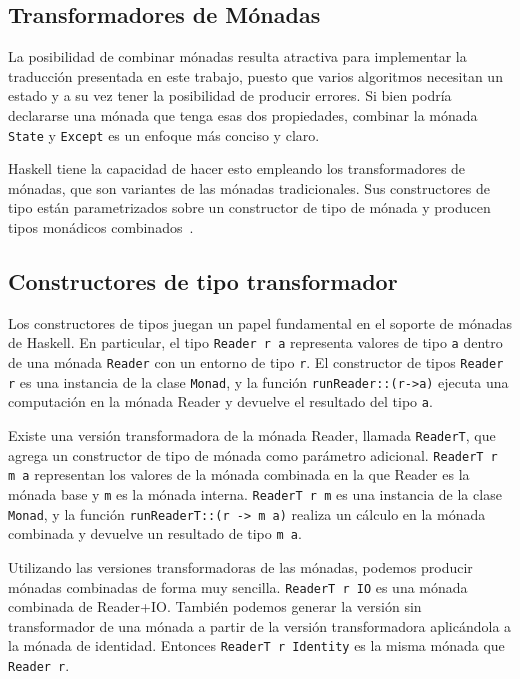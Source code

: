 \subsection{Transformadores de Mónadas}
La posibilidad de combinar mónadas resulta atractiva para implementar la traducción presentada en este trabajo, puesto que varios algoritmos necesitan un estado y a su vez tener la posibilidad de producir errores. Si bien podría declararse una mónada que tenga esas dos propiedades, combinar la mónada \texttt{State} y \texttt{Except} es un enfoque más conciso y claro.

Haskell tiene la capacidad de hacer esto empleando los transformadores de mónadas, que son variantes de las mónadas tradicionales. Sus constructores de tipo están parametrizados sobre un constructor de tipo de mónada y producen tipos monádicos combinados~\cite{monads}.

\subsection{Constructores de tipo transformador}
Los constructores de tipos juegan un papel fundamental en el soporte de mónadas de Haskell. En particular, el tipo \texttt{Reader r a} representa  valores de tipo \texttt{a} dentro de una mónada \texttt{Reader} con un entorno de tipo \texttt{r}. El constructor de tipos \texttt{Reader r} es una instancia de la clase \texttt{Monad}, y la función \texttt{runReader::(r->a)} ejecuta una computación en la mónada Reader y devuelve el resultado del tipo \texttt{a}.

Existe una versión transformadora de la mónada Reader, llamada \texttt{ReaderT}, que agrega un constructor de tipo de mónada como parámetro adicional. \texttt{ReaderT r m a} representan los valores de la mónada combinada en la que Reader es la mónada base y \texttt{m} es la mónada interna. \texttt{ReaderT r m} es una instancia de la clase \texttt{Monad}, y la función \texttt{runReaderT::(r -> m a)} realiza un cálculo en la mónada combinada y devuelve un resultado de tipo \texttt{m a}.

Utilizando las versiones transformadoras de las mónadas, podemos producir mónadas combinadas de forma muy sencilla. \texttt{ReaderT r IO} es una mónada combinada de Reader+IO. También podemos generar la versión sin transformador de una mónada a partir de la versión transformadora aplicándola a la mónada de identidad. Entonces \texttt{ReaderT r Identity} es la misma mónada que \texttt{Reader r}.

